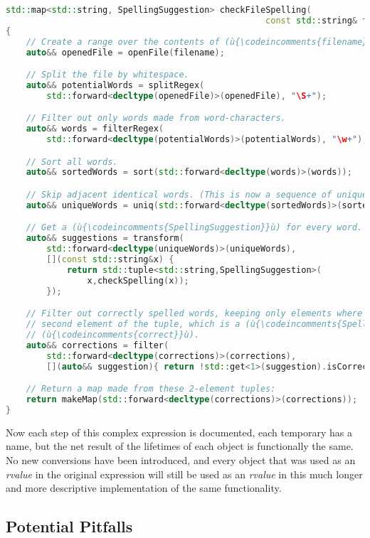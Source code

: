 \begin{lstlisting}[language=C++]
std::map<std::string, SpellingSuggestion> checkFileSpelling(
                                                   const std::string& filename)
{
    // Create a range over the contents of (ù{\codeincomments{filename}}ù).
    auto&& openedFile = openFile(filename);

    // Split the file by whitespace.
    auto&& potentialWords = splitRegex(
        std::forward<decltype(openedFile)>(openedFile), "\S+");

    // Filter out only words made from word-characters.
    auto&& words = filterRegex(
        std::forward<decltype(potentialWords)>(potentialWords), "\w+");

    // Sort all words.
    auto&& sortedWords = sort(std::forward<decltype(words)>(words));

    // Skip adjacent identical words. (This is now a sequence of unique words.)
    auto&& uniqueWords = uniq(std::forward<decltype(sortedWords)>(sortedWords));

    // Get a (ù{\codeincomments{SpellingSuggestion}}ù) for every word.
    auto&& suggestions = transform(
        std::forward<decltype(uniqueWords)>(uniqueWords),
        [](const std::string&x) {
            return std::tuple<std::string,SpellingSuggestion>(
                x,checkSpelling(x));
        });

    // Filter out correctly spelled words, keeping only elements where the
    // second element of the tuple, which is a (ù{\codeincomments{SpellingSuggestion}}ù), is not
    // (ù{\codeincomments{correct}}ù).
    auto&& corrections = filter(
        std::forward<decltype(corrections)>(corrections),
        [](auto&& suggestion){ return !std::get<1>(suggestion).isCorrect(); });

    // Return a map made from these 2-element tuples:
    return makeMap(std::forward<decltype(corrections)>(corrections));
}
\end{lstlisting}

\noindent Now each step of this complex expression is documented, each temporary
has a name, but the net result of the lifetimes of each object is
functionally the same. No new conversions have been introduced, and
every object that was used as an \emph{rvalue} in the original
expression will still be used as an \emph{rvalue} in this much longer
and more descriptive implementation of the same functionality.

\subsection[Potential Pitfalls]{Potential Pitfalls}\label{potential-pitfalls}

